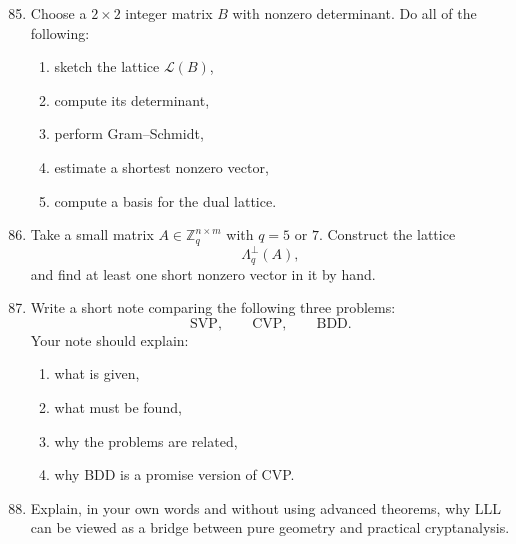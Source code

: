 \documentclass[11pt]{article}
\begin{document}
\begin{enumerate}
	\setcounter{enumi}{84}
	\item Choose a \(2\times 2\) integer matrix \(B\) with nonzero determinant. Do all of the following:
	\begin{enumerate}
		\item sketch the lattice \(\mathcal{L}(B)\),
		\item compute its determinant,
		\item perform Gram--Schmidt,
		\item estimate a shortest nonzero vector,
		\item compute a basis for the dual lattice.
	\end{enumerate}
	
	\item Take a small matrix \(A\in\mathbb{Z}_q^{n\times m}\) with \(q=5\) or \(7\). Construct the lattice
	\[
	\Lambda_q^\perp(A),
	\]
	and find at least one short nonzero vector in it by hand.
	
	\item Write a short note comparing the following three problems:
	\[
	\text{SVP},\qquad \text{CVP},\qquad \text{BDD}.
	\]
	Your note should explain:
	\begin{enumerate}
		\item what is given,
		\item what must be found,
		\item why the problems are related,
		\item why BDD is a promise version of CVP.
	\end{enumerate}
	
	\item Explain, in your own words and without using advanced theorems, why LLL can be viewed as a bridge between pure geometry and practical cryptanalysis.
\end{enumerate}
\end{document}
